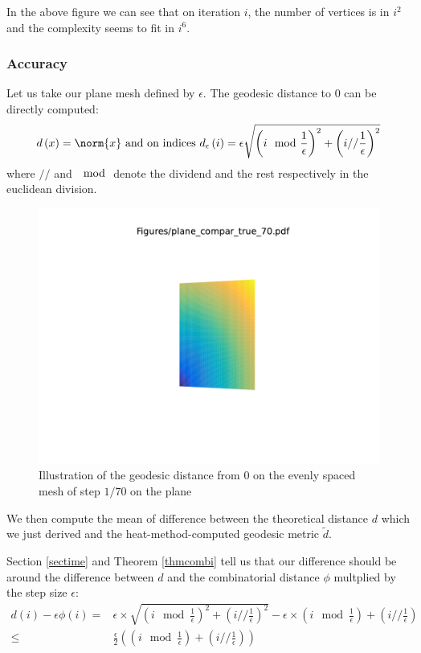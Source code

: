 \documentclass[math, info, english]{cours}
\begin{document}
In the above figure we can see that on iteration $i$, the number of vertices is in $i^{2}$ and the complexity seems to fit in $i^{6}$.

\subsubsection{Accuracy}
Let us take our plane mesh defined by $\epsilon$. The geodesic distance to $0$ can be directly computed:
\begin{equation*}
d\left( x \right) = \norm{x} \text{ and on indices } d_{\epsilon}\left( i \right) = \epsilon\sqrt{\left( i \mod \frac{1}{\epsilon} \right)^{2} + \left( i // \frac{1}{\epsilon} \right)^{2}}
\end{equation*}
where $//$ and $\mod$ denote the dividend and the rest respectively in the euclidean division.
\begin{figure}[h]
	\centering
	\includegraphics{Figures/plane_compar_true_70}
	\caption{Illustration of the geodesic distance from $0$ on the evenly spaced mesh of step $1/70$ on the plane}
\end{figure}

We then compute the mean of difference between the theoretical distance $d$ which we just derived and the heat-method-computed geodesic metric $\tilde{d}$.

Section \ref{sectime} and Theorem \ref{thmcombi} tell us that our difference should be around the difference between $d$ and the combinatorial distance $\phi$ multplied by the step size $\epsilon$:
\begin{equation*}
	\begin{aligned}
	d\left( i \right) - \epsilon\phi\left( i \right) =& \epsilon \times
			\sqrt{\left( i \mod \frac{1}{\epsilon} \right)^{2} + \left( i // \frac{1}{\epsilon} \right)^{2} }
			-
			\epsilon \times\left( i \mod \frac{1}{\epsilon} \right) + \left(i // \frac{1}{\epsilon} \right)\\
	\leq& \frac{\epsilon}{2} \left(\left( i \mod \frac{1}{\epsilon} \right) + \left(i // \frac{1}{\epsilon} \right) \right)
	\end{aligned}
\end{equation*}
\end{document}
